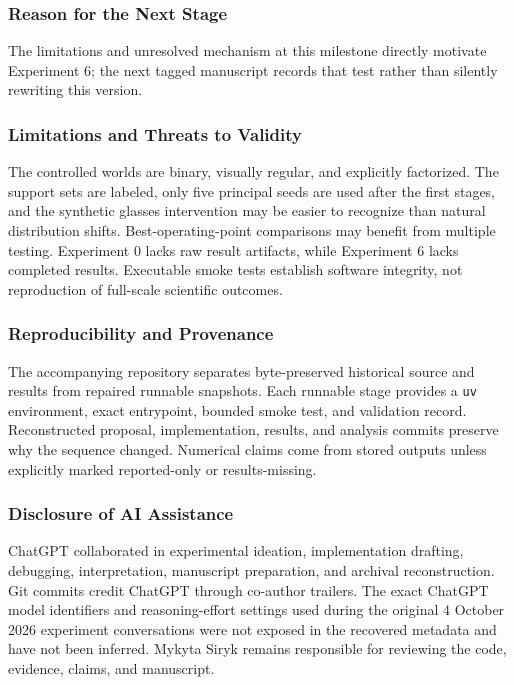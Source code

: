 \documentclass[
  10pt,
]{article}
\begin{document}
\hypertarget{reason-for-the-next-stage}{%
\subsubsection{Reason for the Next
Stage}\label{reason-for-the-next-stage}}

The limitations and unresolved mechanism at this milestone directly
motivate Experiment 6; the next tagged manuscript records that test
rather than silently rewriting this version.

\hypertarget{limitations-and-threats-to-validity}{%
\subsubsection{Limitations and Threats to
Validity}\label{limitations-and-threats-to-validity}}

The controlled worlds are binary, visually regular, and explicitly
factorized. The support sets are labeled, only five principal seeds are
used after the first stages, and the synthetic glasses intervention may
be easier to recognize than natural distribution shifts.
Best-operating-point comparisons may benefit from multiple testing.
Experiment 0 lacks raw result artifacts, while Experiment 6 lacks
completed results. Executable smoke tests establish software integrity,
not reproduction of full-scale scientific outcomes.

\hypertarget{reproducibility-and-provenance}{%
\subsubsection{Reproducibility and
Provenance}\label{reproducibility-and-provenance}}

The accompanying repository separates byte-preserved historical source
and results from repaired runnable snapshots. Each runnable stage
provides a \texttt{uv} environment, exact entrypoint, bounded smoke
test, and validation record. Reconstructed proposal, implementation,
results, and analysis commits preserve why the sequence changed.
Numerical claims come from stored outputs unless explicitly marked
reported-only or results-missing.

\hypertarget{disclosure-of-ai-assistance}{%
\subsubsection{Disclosure of AI
Assistance}\label{disclosure-of-ai-assistance}}

ChatGPT collaborated in experimental ideation, implementation drafting,
debugging, interpretation, manuscript preparation, and archival
reconstruction. Git commits credit ChatGPT through co-author trailers.
The exact ChatGPT model identifiers and reasoning-effort settings used
during the original 4 October 2026 experiment conversations were not
exposed in the recovered metadata and have not been inferred. Mykyta
Siryk remains responsible for reviewing the code, evidence, claims, and
manuscript.
\end{document}
